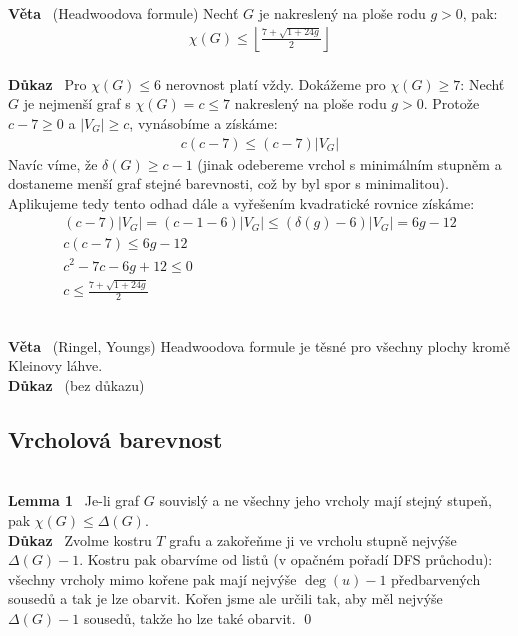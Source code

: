 \documentclass{article}
\renewcommand{\paragraph}[1]{\ \\\smallskip\noindent\textbf{#1}\ }
\begin{document}
\paragraph{Věta} (Headwoodova formule)
Nechť $G$ je nakreslený na ploše rodu $g > 0$, pak:
\begin{align}
	\chi(G) \leq \left\lfloor \frac{7 + \sqrt{1 + 24g}}{2}\right\rfloor
\end{align}
\paragraph{Důkaz} Pro $\chi(G) \leq 6$ nerovnost platí vždy. Dokážeme pro 
$\chi(G) \geq 7$: Nechť $G$ je nejmenší graf s $\chi(G) = c \leq 7$ nakreslený 
na ploše rodu $g > 0$.  Protože $c - 7 \geq 0$ a $|V_G| \geq c$, vynásobíme a 
získáme:
\begin{align}
	c(c-7) \leq (c-7)|V_G|
\end{align}
Navíc víme, že $\delta(G) \geq c-1$ (jinak odebereme vrchol s minimálním stupněm 
a dostaneme menší graf stejné barevnosti, což by byl spor s minimalitou).  
Aplikujeme tedy tento odhad dále a vyřešením kvadratické rovnice získáme:
\begin{align}
	(c-7)|V_G| = (c-1-6)|V_G| \leq (\delta(g)-6)|V_G| = 6g-12 \\
	c(c-7) \leq 6g-12 \\
	c^2 - 7c - 6g+12 \leq 0 \\
	c \leq \frac{7+\sqrt{1+24g}}{2}
\end{align}

\paragraph{Věta} (Ringel, Youngs) Headwoodova formule je těsné pro všechny 
plochy kromě Kleinovy láhve.
\paragraph{Důkaz} (bez důkazu)

\subsection{Vrcholová barevnost}
\paragraph{Lemma 1}
Je-li graf $G$ souvislý a ne všechny jeho vrcholy mají stejný stupeň, pak 
$\chi(G) \leq \Delta(G)$.
\paragraph{Důkaz}
Zvolme kostru $T$ grafu a zakořeňme ji ve vrcholu stupně nejvýše $\Delta(G)-1$.  
Kostru pak obarvíme od listů (v opačném pořadí DFS průchodu): všechny vrcholy 
mimo kořene pak mají nejvýše $\deg(u) -1$ předbarvených sousedů a tak je lze 
obarvit. Kořen jsme ale určili tak, aby měl nejvýše $\Delta(G)-1$ sousedů, takže 
ho lze také obarvit. \qed
\end{document}
